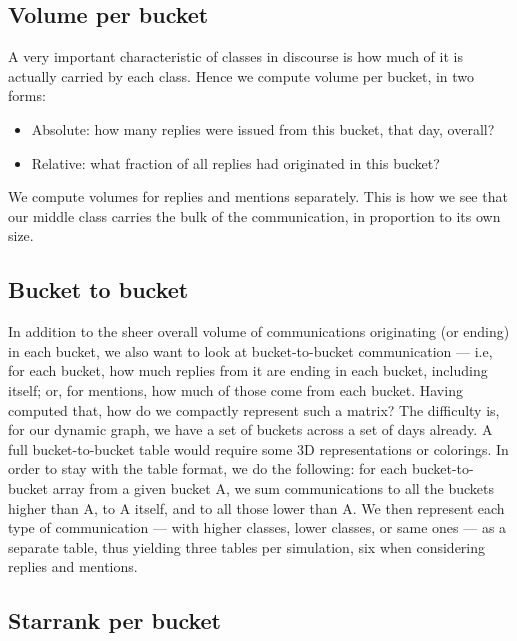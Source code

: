 \documentclass[10pt,oneside]{memoir}
\begin{document}
\pagebreak \subsection{Volume per bucket}
\label{volumeperbucket}

A very important characteristic of classes in discourse is how much of it is actually carried by each class.  Hence we compute volume per bucket, in two forms:


\begin{itemize}


\item Absolute: how many replies were issued from this bucket, that day, overall?

\item Relative: what fraction of all replies had originated in this bucket?
\end{itemize}

We compute volumes for replies and mentions separately.  This is how we see that our middle class carries the bulk of the communication, in proportion to its own size.  


\subsection{Bucket to bucket}
\label{buckettobucket}

In addition to the sheer overall volume of communications originating (or ending) in each bucket, we also want to look at bucket-to-bucket communication --- i.e, for each bucket, how much replies from it are ending in each bucket, including itself; or, for mentions, how much of those come from each bucket.
Having computed that, how do we compactly represent such a matrix?  The difficulty is, for our dynamic graph, we have a set of buckets across a set of days already.  A full bucket-to-bucket table would require some 3D representations or colorings.  In order to stay with the table format, we do the following: for each bucket-to-bucket array from a given bucket A, we sum communications to all the buckets higher than A, to A itself, and to all those lower than A.  We then represent each type of communication --- with higher classes, lower classes, or same ones --- as a separate table, thus yielding three tables per simulation, six when considering replies and mentions.


\subsection{Starrank per bucket}
\label{starrankperbucket}
\end{document}
